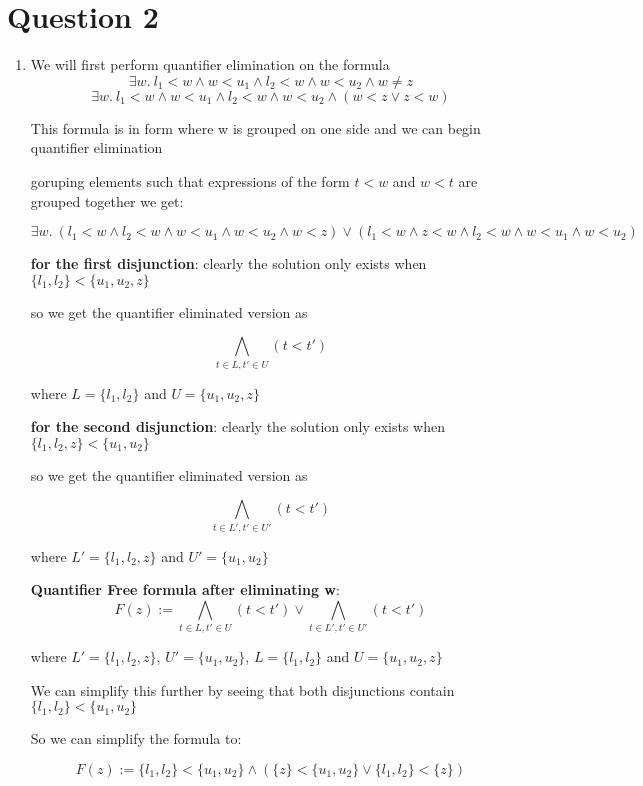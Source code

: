\documentclass{article}
\begin{document}
\section{Question 2}
\begin{enumerate}[label=(\alph*)]
    \item We will first perform quantifier elimination on the formula
    $$\exists w. \ l_1 < w \land w < u_1 \land l_2 < w \land w < u_2 \land w \neq z$$
    $$\exists w. \ l_1 < w \land w < u_1 \land l_2 < w \land w < u_2 \land (w < z \lor z < w)$$
    
    This formula is in form where w is grouped on one side and we can begin quantifier elimination

    goruping elements such that expressions of the form $t < w$ and $w < t$ are grouped together we get:

    $$\exists w. \ (l_1 < w \land l_2 < w \land w < u_1  \land w < u_2 \land w < z) \lor (l_1 < w \land z < w \land l_2 < w \land w < u_1  \land w < u_2)$$

    \textbf{for the first disjunction}: clearly the solution only exists when $\{l_1, l_2\} < \{u_1,u_2, z\}$

    so we get the quantifier eliminated version as 

    $$\bigwedge_{t \in L, t' \in U}(t < t') $$ 
    
    where $L = \{l_1, l_2\}$ and $U = \{u_1, u_2, z\}$

    \textbf{for the second disjunction}: clearly the solution only exists when $\{l_1, l_2, z\} < \{u_1,u_2\}$

    so we get the quantifier eliminated version as

    $$\bigwedge_{t \in L', t' \in U'}(t < t') $$ 
    
    where $L' = \{l_1, l_2, z\}$ and $U' = \{u_1, u_2\}$

    \textbf{Quantifier Free formula after eliminating w}:
     $$F(z) := \bigwedge_{t \in L, t' \in U}(t < t') \lor \bigwedge_{t \in L', t' \in U'}(t < t')$$
     
     where $L' = \{l_1, l_2, z\}$, $U' = \{u_1, u_2\}$,  $L = \{l_1, l_2\}$ and $U = \{u_1, u_2, z\}$

     We can simplify this further by seeing that both disjunctions contain $\{l_1,l_2\} < \{u_1,u_2\}$

        So we can simplify the formula to:

        $$F(z) := \{l_1, l_2\} < \{u_1, u_2\} \land (\{z\} < \{u_1, u_2\} \lor \{l_1,l_2\} < \{z\})$$
        

\end{enumerate}
\end{document}

